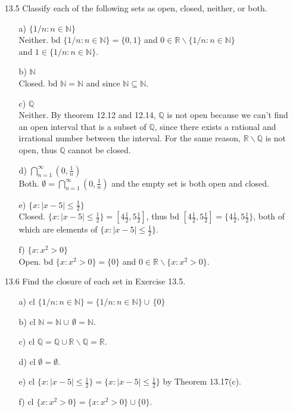 \documentclass[12pt]{article}
\begin{document}
\begin{enumerate}
\begin{enumerate}
\item[13.5] Classify each of the following sets as open, closed, neither, or both. 
\begin{enumerate}
\item[a)] $\{ 1/n: n \in \mathbb{N} \}$ \\
Neither. bd $\{ 1/n: n \in \mathbb{N} \} = \{ 0, 1 \}$ and $0 \in \mathbb{R}\backslash 
\{ 1/n: n \in \mathbb{N} \}$ \\
and $1 \in \{ 1/n: n \in \mathbb{N} \}$.
\item[b)] $\mathbb{N}$ \\
Closed. bd $\mathbb{N} = \mathbb{N}$ and since $\mathbb{N} \subseteq \mathbb{N}$.
\item[c)] $\mathbb{Q}$ \\
Neither. By theorem 12.12 and 12.14, $\mathbb{Q}$ is not open because we can't find an open
interval that is a subset of $\mathbb{Q}$, since there exists a rational and irrational number between
the interval. For the same reason, $\mathbb{R}\backslash \mathbb{Q}$ is not open, thus $\mathbb{Q}$
cannot be closed.
\item[d)] $\bigcap_{n = 1}^{\infty} \left(0, \frac{1}{n}\right)$ \\
Both. $\emptyset = \bigcap_{n = 1}^{\infty} \left(0, \frac{1}{n}\right)$ and the empty set is
both open and closed.
\item[e)] $\{ x : |x - 5| \leq \frac{1}{2} \}$ \\
Closed. $\{ x : |x - 5| \leq \frac{1}{2} \} = [4\frac{1}{2}, 5\frac{1}{2}]$, thus bd 
$[4\frac{1}{2}, 5\frac{1}{2}] = \{4\frac{1}{2}, 5\frac{1}{2}\}$, both of which are elements of 
$\{ x : |x - 5| \leq \frac{1}{2} \}$.
\item[f)] $\{x: x^2 > 0\}$ \\
Open. bd $\{x: x^2 > 0\} = \{0\}$ and $0 \in \mathbb{R}\backslash \{x: x^2 > 0\}$.
\end{enumerate}

\item[13.6] Find the closure of each set in Exercise 13.5.
\begin{enumerate}
\item[a)] cl $\{ 1/n: n \in \mathbb{N} \} = \{ 1/n: n \in \mathbb{N} \} \cup \,\{0\}$
\item[b)] cl $\mathbb{N} = \mathbb{N} \cup \,\emptyset = \mathbb{N}$.
\item[c)] cl $\mathbb{Q} = \mathbb{Q} \cup \mathbb{R}\backslash \mathbb{Q} = \mathbb{R}$.
\item[d)] cl $\emptyset = \emptyset$.
\item[e)] cl $\{ x : |x - 5| \leq \frac{1}{2} \} = \{ x : |x - 5| \leq \frac{1}{2} \}$ by Theorem 13.17(c).
\item[f)] cl $\{x: x^2 > 0\} = \{x: x^2 > 0\} \cup \{0\}$.
\end{enumerate}


\end{enumerate}
\end{enumerate}
\end{document}
